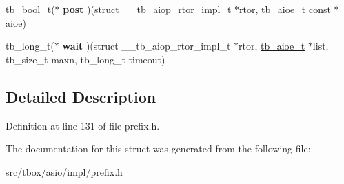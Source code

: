 \begin{DoxyCompactItemize}
\item 
\hypertarget{structtb__aiop__rtor__impl__t_a0b47c7ad5d9f8c92805614a160425343}{tb\-\_\-bool\-\_\-t($\ast$ {\bfseries post} )(struct \-\_\-\-\_\-tb\-\_\-aiop\-\_\-rtor\-\_\-impl\-\_\-t $\ast$rtor, \hyperlink{structtb__aioe__t}{tb\-\_\-aioe\-\_\-t} const $\ast$aioe)}\label{structtb__aiop__rtor__impl__t_a0b47c7ad5d9f8c92805614a160425343}

\item 
\hypertarget{structtb__aiop__rtor__impl__t_a713b0788b1a373a057a623de54be3f60}{tb\-\_\-long\-\_\-t($\ast$ {\bfseries wait} )(struct \-\_\-\-\_\-tb\-\_\-aiop\-\_\-rtor\-\_\-impl\-\_\-t $\ast$rtor, \hyperlink{structtb__aioe__t}{tb\-\_\-aioe\-\_\-t} $\ast$list, tb\-\_\-size\-\_\-t maxn, tb\-\_\-long\-\_\-t timeout)}\label{structtb__aiop__rtor__impl__t_a713b0788b1a373a057a623de54be3f60}

\end{DoxyCompactItemize}


\subsection{Detailed Description}


Definition at line 131 of file prefix.\-h.



The documentation for this struct was generated from the following file\-:\begin{DoxyCompactItemize}
\item 
src/tbox/asio/impl/prefix.\-h\end{DoxyCompactItemize}
